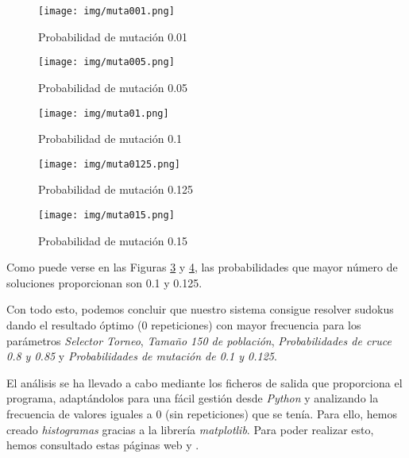 \documentclass[a4,11pt]{article}
\begin{document}
\begin{itemize}
\begin{figure}[h]
\begin{center}
\texttt{[image: img/muta001.png]}
\end{center}
\caption{Probabilidad de mutación 0.01}
\label{fig:muta001}
\end{figure}

\begin{figure}[h]
\begin{center}
\texttt{[image: img/muta005.png]}
\end{center}
\caption{Probabilidad de mutación 0.05}
\label{fig:muta005}
\end{figure}

\begin{figure}[h]
\begin{center}
\texttt{[image: img/muta01.png]}
\end{center}
\caption{Probabilidad de mutación 0.1}
\label{fig:muta01}
\end{figure}

\begin{figure}[h]
\begin{center}
\texttt{[image: img/muta0125.png]}
\end{center}
\caption{Probabilidad de mutación 0.125}
\label{fig:muta0125}
\end{figure}

\begin{figure}[h]
\begin{center}
\texttt{[image: img/muta015.png]}
\end{center}
\caption{Probabilidad de mutación 0.15}
\label{fig:muta015}
\end{figure}

Como puede verse en las Figuras \ref{fig:muta01} y \ref{fig:muta0125}, las probabilidades que mayor número de soluciones proporcionan son 0.1 y 0.125.


\end{itemize}

\newpage
\newpage
\newpage
\newpage

Con todo esto, podemos concluir que nuestro sistema consigue resolver sudokus dando el resultado óptimo (0 repeticiones) con mayor frecuencia para los parámetros \emph{Selector Torneo}, \emph{Tamaño 150 de población}, \emph{Probabilidades de cruce 0.8 y 0.85} y \emph{Probabilidades de mutación de 0.1 y 0.125}.


El análisis se ha llevado a cabo mediante los ficheros de salida que proporciona el programa, adaptándolos para una fácil gestión desde \emph{Python} y analizando la frecuencia de valores iguales a 0 (sin repeticiones) que se tenía. Para ello, hemos creado \emph{histogramas} gracias a la librería \emph{matplotlib}. Para poder realizar esto, hemos consultado estas páginas web \cite{hist} y \cite{fich}.
\end{document}
